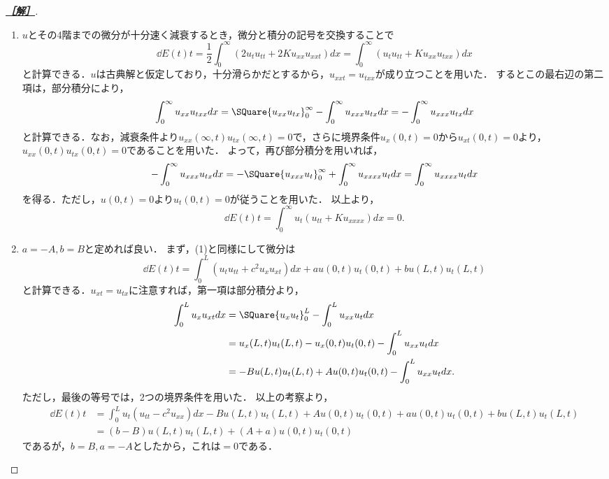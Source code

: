 \documentclass[uplatex,dvipdfmx]{jsarticle}
\begin{document}
\begin{proof}[\bf\underline{［解］}]\mbox{}
    \begin{enumerate}
        \item $u$とその4階までの微分が十分速く減衰するとき，微分と積分の記号を交換することで
        \[\dd{E(t)}{t}=\frac{1}{2}\int^\infty_0(2u_tu_{tt}+2Ku_{xx}u_{xxt})dx=\int^\infty_0(u_{t}u_{tt}+Ku_{xx}u_{txx})dx\]
        と計算できる．$u$は古典解と仮定しており，十分滑らかだとするから，$u_{xxt}=u_{txx}$が成り立つことを用いた．
        するとこの最右辺の第二項は，部分積分により，
        \[\int^\infty_0u_{xx}u_{txx}dx=\SQuare{u_{xx}u_{tx}}^\infty_0-\int^\infty_0u_{xxx}u_{tx}dx=-\int^\infty_0u_{xxx}u_{tx}dx\]
        と計算できる．なお，減衰条件より$u_{xx}(\infty,t)u_{tx}(\infty,t)=0$で，さらに境界条件$u_x(0,t)=0$から$u_{xt}(0,t)=0$より，
        $u_{xx}(0,t)u_{tx}(0,t)=0$であることを用いた．
        よって，再び部分積分を用いれば，
        \[-\int^\infty_0u_{xxx}u_{tx}dx=-\SQuare{u_{xxx}u_t}^\infty_0+\int^\infty_0u_{xxxx}u_tdx=\int^\infty_0u_{xxxx}u_tdx\]
        を得る．ただし，$u(0,t)=0$より$u_t(0,t)=0$が従うことを用いた．
        以上より，
        \[\dd{E(t)}{t}=\int^\infty_0u_t(u_{tt}+Ku_{xxxx})dx=0.\]
        \item $a=-A,b=B$と定めれば良い．
        まず，(1)と同様にして微分は
        \[\dd{E(t)}{t}=\int^L_0(u_tu_{tt}+c^2u_xu_{xt})dx+au(0,t)u_t(0,t)+bu(L,t)u_t(L,t)\]
        と計算できる．$u_{xt}=u_{tx}$に注意すれば，第一項は部分積分より，
        \begin{align*}
            \int^L_0u_xu_{xt}dx&=\SQuare{u_xu_t}^L_0-\int^L_0u_{xx}u_tdx\\
            &=u_x(L,t)u_t(L,t)-u_x(0,t)u_t(0,t)-\int^L_0u_{xx}u_tdx\\
            &=-Bu(L,t)u_t(L,t)+Au(0,t)u_t(0,t)-\int^L_0u_{xx}u_tdx.
        \end{align*}
        ただし，最後の等号では，2つの境界条件を用いた．
        以上の考察より，
        \begin{align*}
            \dd{E(t)}{t}&=\int^L_0u_t(u_{tt}-c^2u_{xx})dx-Bu(L,t)u_t(L,t)+Au(0,t)u_t(0,t)+au(0,t)u_t(0,t)+bu(L,t)u_t(L,t)\\
            &=(b-B)u(L,t)u_t(L,t)+(A+a)u(0,t)u_t(0,t)
        \end{align*}
        であるが，$b=B,a=-A$としたから，これは$=0$である．
    \end{enumerate}
\end{proof}

%
\end{document}
